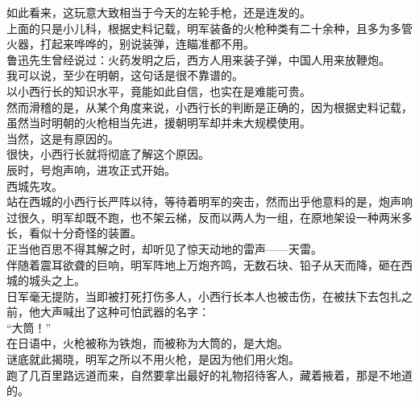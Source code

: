 \begin{multicols}{\theparacolNo}
如此看来，这玩意大致相当于今天的左轮手枪，还是连发的。\\

上面的只是小儿科，根据史料记载，明军装备的火枪种类有二十余种，且多为多管火器，打起来哗哗的，别说装弹，连瞄准都不用。\\

鲁迅先生曾经说过：火药发明之后，西方人用来装子弹，中国人用来放鞭炮。\\

我可以说，至少在明朝，这句话是很不靠谱的。\\

以小西行长的知识水平，竟能如此自信，也实在是难能可贵。\\

然而滑稽的是，从某个角度来说，小西行长的判断是正确的，因为根据史料记载，虽然当时明朝的火枪相当先进，援朝明军却并未大规模使用。\\

当然，这是有原因的。\\

很快，小西行长就将彻底了解这个原因。\\

辰时，号炮声响，进攻正式开始。\\

西城先攻。\\

站在西城的小西行长严阵以待，等待着明军的突击，然而出乎他意料的是，炮声响过很久，明军却既不跑，也不架云梯，反而以两人为一组，在原地架设一种两米多长，看似十分奇怪的装置。\\

正当他百思不得其解之时，却听见了惊天动地的雷声——天雷。\\

伴随着震耳欲聋的巨响，明军阵地上万炮齐鸣，无数石块、铅子从天而降，砸在西城的城头之上。\\

日军毫无提防，当即被打死打伤多人，小西行长本人也被击伤，在被扶下去包扎之前，他大声喊出了这种可怕武器的名字：\\

“大筒！”\\

在日语中，火枪被称为铁炮，而被称为大筒的，是大炮。\\

谜底就此揭晓，明军之所以不用火枪，是因为他们用火炮。\\

跑了几百里路远道而来，自然要拿出最好的礼物招待客人，藏着掖着，那是不地道的。\\


\end{multicols}
